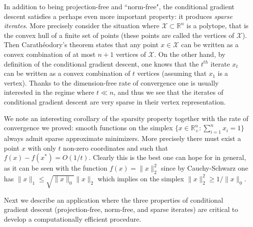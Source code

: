\documentclass[openany]{now}
\newcommand{\R}{\mathbb{R}}
\newcommand{\cX}{\mathcal{X}}
\begin{document}
In addition to being projection-free and ``norm-free", the conditional gradient descent satisfies a perhaps even more important property: it produces {\em sparse iterates}. More precisely consider the situation where $\cX \subset \R^n$ is a polytope, that is the convex hull of a finite set of points (these points are called the vertices of $\cX$). Then Carath\'eodory's theorem states that any point $x \in \cX$ can be written as a convex combination of at most $n+1$ vertices of $\cX$. On the other hand, by definition of the conditional gradient descent, one knows that the $t^{th}$ iterate $x_t$ can be written as a convex combination of $t$ vertices (assuming that $x_1$ is a vertex). Thanks to the dimension-free rate of convergence one is usually interested in the regime where $t \ll n$, and thus we see that the iterates of conditional gradient descent are very sparse in their vertex representation.

We note an interesting corollary of the sparsity property together with the rate of convergence we proved: smooth functions on the simplex $\{x \in \mathbb{R}_+^n : \sum_{i=1}^n x_i = 1\}$ always admit sparse approximate minimizers. More precisely there must exist a point $x$ with only $t$ non-zero coordinates and such that $f(x) - f(x^*) = O(1/t)$. Clearly this is the best one can hope for in general, as it can be seen with the function $f(x) = \|x\|^2_2$ since by Cauchy-Schwarz one has $\|x\|_1 \leq \sqrt{\|x\|_0} \|x\|_2$ which implies on the simplex $\|x\|_2^2 \geq 1 / \|x\|_0$.


Next we describe an application where the three properties of conditional gradient descent (projection-free, norm-free, and sparse iterates) are critical to develop a computationally efficient procedure.
\end{document}
